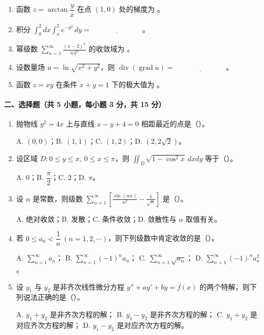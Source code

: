 \begin{enumerate}
  \item 函数 $z=\arctan\dfrac{y}{x}$ 在点 $(1,0)$ 处的梯度为 \underline{\hspace{3cm}}。

  \item 积分 \(\displaystyle \int_0^2 dx\int_x^2 e^{-y^2}\,dy=\underline{\hspace{3cm}}\)。

  \item 幂级数 \(\displaystyle \sum_{n=1}^{\infty}\frac{(x-2)^n}{n4^n}\)
  的收敛域为 \underline{\hspace{3cm}}。

  \item 设数量场 $u=\ln\sqrt{x^2+y^2}$，则 \(\displaystyle \operatorname{div}(\operatorname{grad}u)=\underline{\hspace{3cm}}\)。

  \item 函数 $z=xy$ 在条件 $x+y=1$ 下的极大值为 \underline{\hspace{3cm}}。
\end{enumerate}

\paragraph*{二、选择题（共 5 小题，每小题 3 分，共 15 分）}

\begin{enumerate}
  \item 抛物线 $y^2=4x$ 上与直线 $x-y+4=0$ 相距最近的点是（\quad）。

  A. $(0,0)$；\quad B. $(1,1)$；\quad C. $(1,2)$；\quad D. $(2,2\sqrt2)$。

  \item 设区域 $D:0\le y\le x,\ 0\le x\le \pi$，则 \(\displaystyle \iint_D \sqrt{1-\cos^2 x}\,dxdy\)
  等于（\quad）。

  A. $0$；\quad B. $\dfrac{\pi}{2}$；\quad C. $2$；\quad D. $\pi$。

  \item 设 $\alpha$ 是常数，则级数 \(\displaystyle \sum_{n=1}^{\infty}\left[\frac{\sin(n\alpha)}{n^2}-\frac1{\sqrt n}\right]\)
  是（\quad）。

  A. 绝对收敛；\quad B. 发散；\quad C. 条件收敛；\quad D. 敛散性与 $\alpha$ 取值有关。

  \item 若 $0\le a_n<\dfrac1n\ (n=1,2,\cdots)$，则下列级数中肯定收敛的是（\quad）。

  A. $\sum_{n=1}^{\infty}a_n$；\quad
  B. $\sum_{n=1}^{\infty}(-1)^na_n$；\quad
  C. $\sum_{n=1}^{\infty}\sqrt{a_n}$；\quad
  D. $\sum_{n=1}^{\infty}(-1)^na_n^2$。

  \item 设 $y_1$ 与 $y_2$ 是非齐次线性微分方程 \(\displaystyle y''+ay'+by=f(x)\)
  的两个特解，则下列说法正确的是（\quad）。

  A. $y_1+y_2$ 是非齐次方程的解；\quad
  B. $y_1-y_2$ 是非齐次方程的解；\quad
  C. $y_1+y_2$ 是对应齐次方程的解；\quad
  D. $y_1-y_2$ 是对应齐次方程的解。
\end{enumerate}

